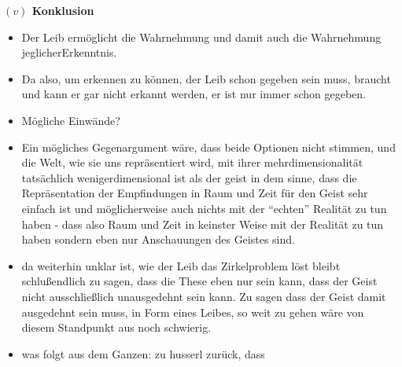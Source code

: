 \documentclass[a4paper, 12pt]{article}
\begin{document}
\begin{onehalfspace}
\vspace{5mm}
\noindent\textbf{$(v)$ Konklusion}

\begin{itemize}
  \item Der Leib ermöglicht die Wahrnehmung und damit auch die Wahrnehmung jeglicherErkenntnis.
  \item Da also, um erkennen zu können, der Leib schon gegeben sein muss, braucht und kann er gar nicht erkannt werden, er ist nur immer schon gegeben.
  \item Mögliche Einwände?
  \item Ein mögliches Gegenargument wäre, dass beide Optionen nicht stimmen, und die Welt, wie sie uns repräsentiert wird, mit ihrer mehrdimensionalität tatsächlich wenigerdimensional ist als der geist in dem sinne, dass die Repräsentation der Empfindungen in Raum und Zeit für den Geist sehr einfach ist und möglicherweise auch nichts mit der "`echten"' Realität zu tun haben - dass also Raum und Zeit in keinster Weise mit der Realität zu tun haben sondern eben nur Anschauungen des Geistes sind.
  \item da weiterhin unklar ist, wie der Leib das Zirkelproblem löst bleibt schlußendlich zu sagen, dass die These eben nur sein kann, dass der Geist nicht ausschließlich unausgedehnt sein kann. Zu sagen dass der Geist damit ausgedehnt sein muss, in Form eines Leibes, so weit zu gehen wäre von diesem Standpunkt aus noch schwierig.
  \item was folgt aus dem Ganzen: zu husserl zurück, dass 
\end{itemize}



\end{onehalfspace}
\end{document}
